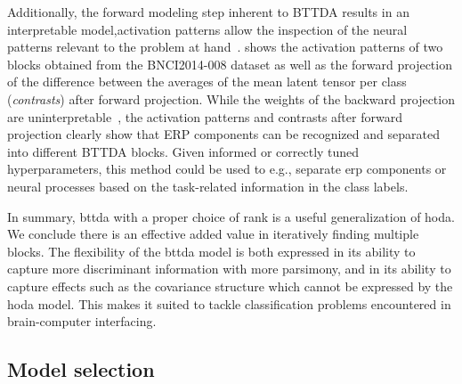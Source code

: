 \documentclass[twocolumn]{article}
\begin{document}
	Additionally, the forward modeling step inherent to BTTDA results
	in an interpretable model,activation patterns allow the inspection of the
	neural patterns relevant to the problem at hand~\cite{Haufe2014}.
	shows the activation patterns
	of two blocks obtained from the BNCI2014-008 dataset as well as the forward
	projection of the difference between the averages of the mean latent tensor per
	class (\emph{contrasts}) after forward projection.
	While the weights of the backward projection are
	uninterpretable~\cite{Haufe2014},
	the activation patterns and contrasts after forward projection clearly show
	that ERP components can be recognized and separated into different
	BTTDA blocks.
	Given informed or correctly tuned hyperparameters, this method could be used to
	e.g., separate \ac{erp} components or neural processes based on the task-related
	information in the class labels.

	In summary, \ac{bttda} with a proper choice of rank is a useful generalization
	of \ac{hoda}.
	We conclude there is an effective	added value in iteratively finding multiple blocks.
	The flexibility of the \ac{bttda} model is both expressed in its ability
	to capture more discriminant information with more parsimony,
	and in its ability to capture effects such as the covariance structure which
	cannot be expressed by the \ac{hoda} model.
	This makes it suited to tackle classification problems encountered in brain-computer interfacing.

	\subsection{Model selection}
\end{document}

